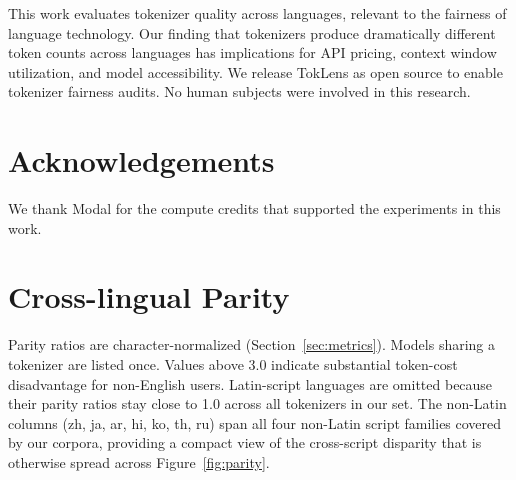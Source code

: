 \documentclass[11pt]{article}
\begin{document}
This work evaluates tokenizer quality across languages, relevant to the fairness of language technology. Our finding that tokenizers produce dramatically different token counts across languages has implications for API pricing, context window utilization, and model accessibility. We release TokLens as open source to enable tokenizer fairness audits. No human subjects were involved in this research.

\section*{Acknowledgements}

We thank Modal for the compute credits that supported the experiments in this work.



\appendix
\onecolumn

\section{Cross-lingual Parity}
\label{app:parity}

Parity ratios are character-normalized (Section~\ref{sec:metrics}). Models sharing a tokenizer are listed once. Values above 3.0 indicate substantial token-cost disadvantage for non-English users. Latin-script languages are omitted because their parity ratios stay close to 1.0 across all tokenizers in our set. The non-Latin columns (zh, ja, ar, hi, ko, th, ru) span all four non-Latin script families covered by our corpora, providing a compact view of the cross-script disparity that is otherwise spread across Figure~\ref{fig:parity}.
\end{document}
